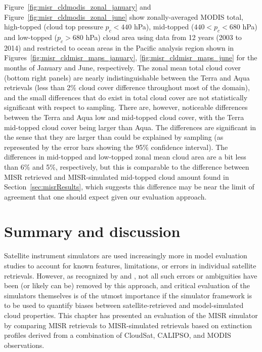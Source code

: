 Figure~\ref{fig:misr_cldmodis_zonal_january} and
Figure~\ref{fig:misr_cldmodis_zonal_june} show zonally-averaged MODIS
total, high-topped (cloud top pressure \(p_c < 440\) hPa), mid-topped
(\(440 < p_c < 680\) hPa) and low-topped (\(p_c > 680\) hPa) cloud area
using data from 12 years (2003 to 2014) and restricted to ocean areas in
the Pacific analysis region shown in
Figures~\ref{fig:misr_cldmisr_maps_january}, \ref{fig:misr_cldmisr_maps_june}
for the months of January and June, respectively. The zonal mean total
cloud cover (bottom right panels) are nearly indistinguishable between
the Terra and Aqua retrievals (less than 2\% cloud cover difference
throughout most of the domain), and the small differences that do exist
in total cloud cover are not statistically significant with respect to
sampling. There are, however, noticeable differences between the Terra
and Aqua low and mid-topped cloud cover, with the Terra mid-topped cloud
cover being larger than Aqua. The differences are significant in the
sense that they are larger than could be explained by sampling (as
represented by the error bars showing the 95\% confidence interval). The
differences in mid-topped and low-topped zonal mean cloud area are a bit
less than 6\% and 5\%, respectively, but this is comparable to the
difference between MISR retrieved and MISR-simulated mid-topped cloud
amount found in Section~\ref{sec:misrResults}, which suggests this
difference may be near the limit of agreement that one should expect
given our evaluation approach.

\section{Summary and discussion}\label{sec:misrSummary}

Satellite instrument simulators are used increasingly more in model
evaluation studies to account for known features, limitations, or errors
in individual satellite retrievals. However, as recognized by
\citet{pincus_et_al_2012} and \citet{mace_et_al_2011}, not all such
errors or ambiguities have been (or likely can be) removed by this
approach, and critical evaluation of the simulators themselves is of the
utmost importance if the simulator framework is to be used to quantify
biases between satellite-retrieved and model-simulated cloud properties.
This chapter has presented an evaluation of the MISR simulator by
comparing MISR retrievals to MISR-simulated retrievals based on
extinction profiles derived from a combination of CloudSat, CALIPSO, and
MODIS observations.

